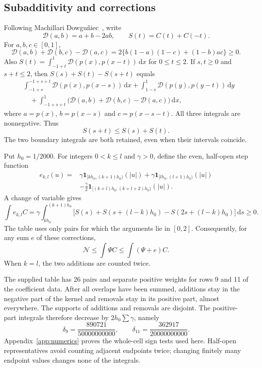 \documentclass[10pt]{article}
\newcommand{\ind}{\mathbf 1}
\newcommand{\dd}{\,\mathrm d}
\newcommand{\Ncal}{\mathcal N}
\begin{document}
\subsection{Subadditivity and corrections}\label{sec:corrections}
Following Machillari Dowgu\~niec~\cite{Machillari}, write
\[
\mathcal D(a,b)=a+b-2ab,\qquad S(t)=C(t)+C(-t).
\]
For $a,b,c\in[0,1]$,
\[
\mathcal D(a,b)+\mathcal D(b,c)-\mathcal D(a,c)
=2\{b(1-a)(1-c)+(1-b)ac\}\geq0.
\]
Also $S(t)=\int_{-1+t}^1\mathcal D(p(x),p(x-t))\dd x$ for $0\leq t\leq2$.
If $s,t\geq0$ and $s+t\leq2$, then $S(s)+S(t)-S(s+t)$ equals
\begin{align*}
&\int_{-1+s}^{-1+s+t}\mathcal D(p(x),p(x-s))\dd x
+\int_{1-s}^{1}\mathcal D(p(y),p(y-t))\dd y\\
&\quad+\int_{-1+s+t}^1\bigl(\mathcal D(a,b)+\mathcal D(b,c)-\mathcal D(a,c)\bigr)\dd x,
\end{align*}
where $a=p(x)$, $b=p(x-s)$ and $c=p(x-s-t)$.
All three integrals are nonnegative. Thus
\begin{equation}\label{eq:subadd}
S(s+t)\leq S(s)+S(t).
\end{equation}
The two boundary integrals are both retained, even when their intervals coincide.

Put $h_0=1/2000$. For integers $0<k\leq l$ and $\gamma>0$, define the even, half-open step function
\begin{align*}
e_{k,l}(u)={}&\gamma\ind_{[kh_0,(k+1)h_0)}(|u|)
 +\gamma\ind_{[lh_0,(l+1)h_0)}(|u|)\\
&-\frac\gamma2\ind_{[(k+l)h_0,(k+l+2)h_0)}(|u|).
\end{align*}
A change of variable gives
\[
\int e_{k,l}C=\gamma\int_{kh_0}^{(k+1)h_0}
\bigl[S(s)+S(s+(l-k)h_0)-S(2s+(l-k)h_0)\bigr]\dd s\geq0.
\]
The table uses only pairs for which the arguments lie in $[0,2]$.
Consequently, for any sum $e$ of these corrections,
\begin{equation}\label{eq:correction-direction}
\Ncal\leq\int\Psi C\leq\int(\Psi+e)C.
\end{equation}
When $k=l$, the two additions are counted twice.

The supplied table has 26 pairs and separate positive weights for rows 9 and 11 of the coefficient data. After all overlaps have been summed, additions stay in the negative part of the kernel and removals stay in its positive part, almost everywhere. The supports of additions and removals are disjoint.
The positive-part integrals therefore decrease by $2h_0\sum\gamma$, namely
\begin{equation}\label{eq:losses}
\delta_9=\frac{890721}{50000000000},\qquad
\delta_{11}=\frac{362917}{20000000000}.
\end{equation}
Appendix~\ref{app:numerics} proves the whole-cell sign tests used here. Half-open representatives avoid counting adjacent endpoints twice; changing finitely many endpoint values changes none of the integrals.
\end{document}
